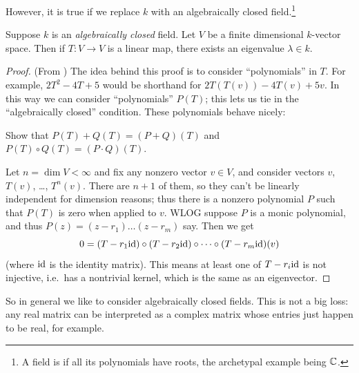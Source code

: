 However, it is true if we replace $k$ with an
algebraically closed field.\footnote{A field is 
	if all its polynomials have roots,
	the archetypal example being $\mathbb C$.}
\begin{theorem}
	Suppose $k$ is an \emph{algebraically closed} field.
	Let $V$ be a finite dimensional $k$-vector space.
	Then if $T \colon V \to V$ is a linear map,
	there exists an eigenvalue $\lambda \in k$.
\end{theorem}
\begin{proof}
	(From \cite{ref:axler})
	The idea behind this proof is to consider ``polynomials'' in $T$.
	For example, $2T^2-4T+5$ would be shorthand for $2T(T(v)) - 4T(v) + 5v$.
	In this way we can consider ``polynomials'' $P(T)$;
	this lets us tie in the ``algebraically closed'' condition.
	These polynomials behave nicely:
	\begin{ques}
		Show that $P(T)+Q(T) = (P+Q)(T)$ and $P(T) \circ Q(T) = (P \cdot Q)(T)$.
	\end{ques}

	Let $n = \dim V < \infty$ and fix any nonzero vector $v \in V$,
	and consider vectors $v$, $T(v)$, \dots, $T^n (v)$.
	There are $n+1$ of them,
	so they can't be linearly independent for dimension reasons;
	thus there is a nonzero polynomial $P$ such that $P(T)$
	is zero when applied to $v$.
	WLOG suppose $P$ is a monic polynomial,
	and thus $P(z) = (z-r_1)\dots(z-r_m)$ say.
	Then we get
	\[ 0 = (T - r_1 \mathrm{id}) \circ (T - r_2 \mathrm{id}) \circ \dots
		\circ (T - r_m \mathrm{id})(v) \]
	(where $\mathrm{id}$ is the identity matrix).  This means at least one of
	$T - r_i \mathrm{id}$ is not injective, i.e.\ has a nontrivial kernel,
	which is the same as an eigenvector.
\end{proof}
So in general we like to consider algebraically closed fields.
This is not a big loss:
any real matrix can be interpreted as a complex matrix
whose entries just happen to be real, for example.


